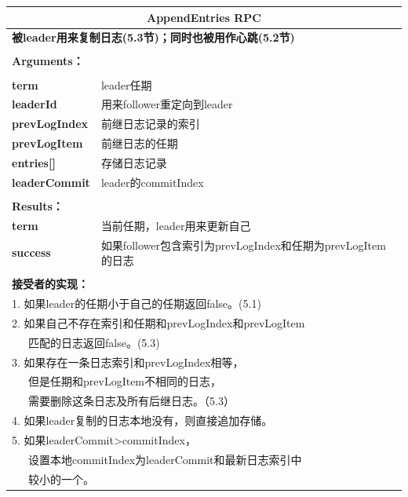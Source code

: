\documentclass[journal]{IEEEtran}
\begin{document}
\begin{table}[htp]
\begin{center}
\begin{tabular}{|p{2cm}p{6cm}|}
\hline
\multicolumn{2}{|c|}{\textbf{AppendEntries RPC}}  \\
\hline
\multicolumn{2}{|l|}{\textbf{被leader用来复制日志(5.3节)；同时也被用作心跳(5.2节)}} \\
&\\
\multicolumn{2}{|l|}{\textbf{Arguments：}} \\
&\\
\textbf{term} & leader任期\\
\textbf{leaderId} & 用来follower重定向到leader\\
\textbf{prevLogIndex} & 前继日志记录的索引 \\ 
\textbf{prevLogItem} & 前继日志的任期 \\
\textbf{entries[]} & 存储日志记录\\
\textbf{leaderCommit} & leader的commitIndex\\
&\\
\multicolumn{2}{|l|}{\textbf{Results：}} \\
\textbf{term} & 当前任期，leader用来更新自己\\
\textbf{success} & 如果follower包含索引为prevLogIndex和任期为prevLogItem的日志\\
&\\
\multicolumn{2}{|l|}{\textbf{接受者的实现：}} \\
\multicolumn{2}{|l|}{1. 如果leader的任期小于自己的任期返回false。(5.1)} \\
\multicolumn{2}{|l|}{2. 如果自己不存在索引和任期和prevLogIndex和prevLogItem} \\
\multicolumn{2}{|l|}{\ \ \ 匹配的日志返回false。(5.3)}\\
\multicolumn{2}{|l|}{3. 如果存在一条日志索引和prevLogIndex相等，}\\
\multicolumn{2}{|l|}{\ \ \ 但是任期和prevLogItem不相同的日志，}\\
\multicolumn{2}{|l|}{\ \ \ 需要删除这条日志及所有后继日志。（5.3）}\\
\multicolumn{2}{|l|}{4. 如果leader复制的日志本地没有，则直接追加存储。}\\
\multicolumn{2}{|l|}{5. 如果leaderCommit>commitIndex，}\\
\multicolumn{2}{|l|}{\ \ \ 设置本地commitIndex为leaderCommit和最新日志索引中}\\
\multicolumn{2}{|l|}{\ \ \ 较小的一个。}\\
\hline
\end{tabular}
\end{center}
\label{default}
\end{table}%
\end{document}
